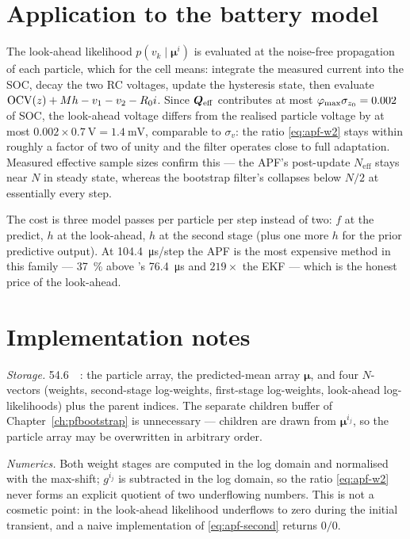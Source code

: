 \section{Application to the battery model}
The look-ahead likelihood $p(v_k \mid \bm{\mu}^i)$ is evaluated at the noise-free propagation of
each particle, which for the cell means: integrate the measured current into the SOC, decay the two
RC voltages, update the hysteresis state, then evaluate
$\mathrm{OCV}(z) + Mh - v_1 - v_2 - R_0 i$.  Since $\bm{Q}_{\mathrm{eff}}$ contributes at most
$\varphi_{\max}\sigma_{z_0} = \num{0.002}$ of SOC, the look-ahead voltage differs from the
realised particle voltage by at most $\num{0.002}\times\SI{0.7}{\volt} = \SI{1.4}{\milli\volt}$,
comparable to $\sigma_v$: the ratio \eqref{eq:apf-w2} stays within roughly a factor of two of unity
and the filter operates close to full adaptation.  Measured effective sample sizes confirm this ---
the APF's post-update $N_{\mathrm{eff}}$ stays near $N$ in steady state, whereas the bootstrap
filter's collapses below $N/2$ at essentially every step.

The cost is three model passes per particle per step instead of two: $f$ at the predict, $h$ at the
look-ahead, $h$ at the second stage (plus one more $h$ for the prior predictive output).  At
\SI{104.4}{\micro\second}/step the APF is the most expensive method in this family ---
\SI{37}{\percent} above 's \SI{76.4}{\micro\second} and $219\times$ the EKF ---
which is the honest price of the look-ahead.

\section{Implementation notes}
\emph{Storage.}  \SI{54.6}{\kilo\byte}: the particle array, the predicted-mean array $\bm{\mu}$,
and four $N$-vectors (weights, second-stage log-weights, first-stage log-weights, look-ahead
log-likelihoods) plus the parent indices.  The separate children buffer of
Chapter~\ref{ch:pfbootstrap} is unnecessary --- children are drawn from $\bm\mu^{i_j}$, so the
particle array may be overwritten in arbitrary order.

\emph{Numerics.}  Both weight stages are computed in the log domain and normalised with the
max-shift; $g^{i_j}$ is subtracted in the log domain, so the ratio \eqref{eq:apf-w2} never forms an
explicit quotient of two underflowing numbers.  This is not a cosmetic point: in  the
look-ahead likelihood underflows to zero during the initial transient, and a naive implementation
of \eqref{eq:apf-second} returns $0/0$.

